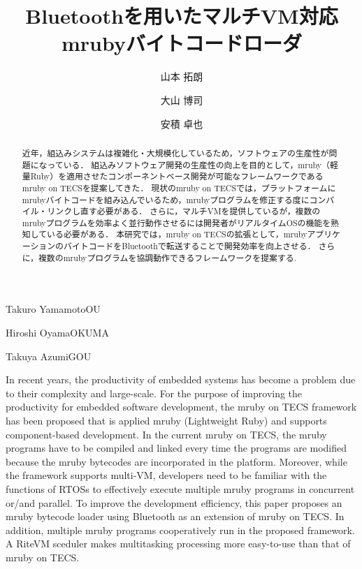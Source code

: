 \documentclass[submit,techrep]{ipsj}
\begin{document}
\title{Bluetoothを用いたマルチVM対応\\mrubyバイトコードローダ}





\author{山本 拓朗}{Takuro Yamamoto}{OU}%
\author{大山 博司}{Hiroshi Oyama}{OKUMA}%
\author{安積 卓也}{Takuya Azumi}{GOU}%

\begin{abstract}
近年，組込みシステムは複雑化・大規模化しているため，ソフトウェアの生産性が問題になっている．
組込みソフトウェア開発の生産性の向上を目的として，mruby（軽量Ruby）を適用させたコンポーネントベース開発が可能なフレームワークであるmruby on TECSを提案してきた．
現状のmruby on TECSでは，プラットフォームにmrubyバイトコードを組み込んでいるため，mrubyプログラムを修正する度にコンパイル・リンクし直す必要がある．
さらに，マルチVMを提供しているが，複数のmrubyプログラムを効率よく並行動作させるには開発者がリアルタイムOSの機能を熟知している必要がある．
本研究では，mruby on TECSの拡張として，mrubyアプリケーションのバイトコードをBluetoothで転送することで開発効率を向上させる．
さらに，複数のmrubyプログラムを協調動作できるフレームワークを提案する.
\vspace{-5mm}
\end{abstract}


\begin{eabstract}
In recent years, the productivity of embedded systems has become a problem due to their complexity and large-scale.
For the purpose of improving the productivity for embedded software development, the mruby on TECS framework has been proposed that is applied mruby (Lightweight Ruby) and supports component-based development.
In the current mruby on TECS, the mruby programs have to be compiled and linked every time the programs are modified because the mruby bytecodes are incorporated in the platform.
Moreover, while the framework supports multi-VM, developers need to be familiar with the functions of RTOSs to effectively execute multiple mruby programs in concurrent or/and parallel.
To improve the development efficiency, this paper proposes an mruby bytecode loader using Bluetooth as an extension of mruby on TECS.
In addition, multiple mruby programs cooperatively run in the proposed framework.
A RiteVM sceduler makes multitasking processing more easy-to-use than that of mruby on TECS.
\vspace{-5mm}
\end{eabstract}
\end{document}
